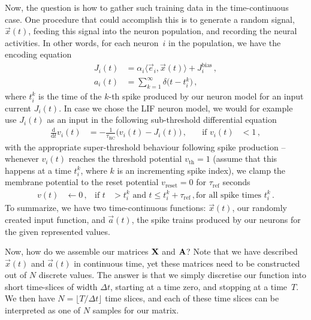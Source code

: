 \documentclass[10pt,letterpaper,oneside]{article}
\begin{document}
Now, the question is how to gather such training data in the time-continuous case. One procedure that could accomplish this is to generate a random signal, $\vec x(t)$, feeding this signal into the neuron population, and recording the neural activities. In other words, for each neuron~$i$ in the population, we have the encoding equation
\begin{align*}
J_i(t) &= \alpha_i \langle \vec e_i, \vec x(t) \rangle + J^\mathrm{bias}_i \,, \\
a_i(t) &= \sum_{k=1}^\infty \delta\big(t - t^k_i\big) \,,
\end{align*}
where $t^k_i$ is the time of the $k$-th spike produced by our neuron model for an input current $J_i(t)$. In case we chose the LIF neuron model, we would for example use $J_i(t)$ as an input in the following sub-threshold differential equation
\begin{align*}
\frac{\mathrm{d}}{\mathrm{d}t} v_i(t) &= -\frac{1}{\tau_\mathrm{RC}} \big( v_i(t) - J_i(t) \big) \,, \quad &\text{if } v_i(t) &< 1\,,
\end{align*}
with the appropriate super-threshold behaviour following spike production -- whenever $v_i(t)$ reaches the threshold potential $v_\mathrm{th} = 1$ (assume that this happens at a time $t_i^k$, where $k$ is an incrementing spike index), we clamp the membrane potential to the reset potential $v_\mathrm{reset} = 0$ for $\tau_\mathrm{ref}$ seconds
\begin{align*}
v(t) &\gets 0 \,, &\text{if } t &> t_i^k \text{ and } t \leq t_i^k + \tau_\mathrm{ref} \,, \text{for all spike times } t_i^k \,.
\end{align*}
To summarize, we have two time-continuous functions: $\vec x(t)$, our randomly created input function, and $\vec a(t)$, the spike trains produced by our neurons for the given represented values.

Now, how do we assemble our matrices ${\mathbf{X}}$ and ${\mathbf{A}}$? Note that we have described $\vec x(t)$ and $\vec a(t)$ in continuous time, yet these matrices need to be constructed out of $N$ discrete values. The answer is that we simply discretise our function into short time-slices of width $\Delta t$, starting at a time zero, and stopping at a time~$T$. We then have $N = \lfloor T / \Delta t \rfloor$ time slices, and each of these time slices can be interpreted as one of $N$ samples for our matrix.
\end{document}
